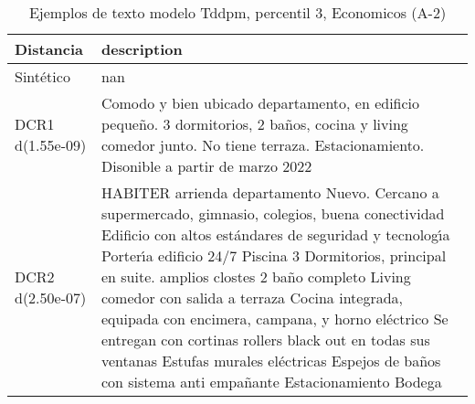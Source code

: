 \begin{table}[H]
\centering
\fontsize{10}{14}\selectfont
\caption{Ejemplos de texto modelo Tddpm, percentil 3, Economicos (A-2)}
\label{table-example-economicos-a-2-tddpm_mlp-3p-text}
\begin{tabular}{|l|m{35em}|}
\hline
\rowcolor[gray]{0.8}
Distancia & description \\
\hline Sintético & nan \\
\hline DCR1 d(1.55e-09) & Comodo y bien ubicado departamento, en edificio peque\~no. 3 dormitorios, 2 ba\~nos, cocina y living comedor junto. No tiene terraza. Estacionamiento. Disonible a partir de marzo 2022 \\
\hline DCR2 d(2.50e-07) & HABITER arrienda departamento Nuevo.  Cercano a supermercado, gimnasio, colegios, buena conectividad  Edificio con altos est\'andares de seguridad y tecnolog{\'\i}a Porter{\'\i}a edificio 24/7 Piscina  3 Dormitorios, principal en suite. amplios clostes 2 ba\~no completo Living comedor con salida a terraza Cocina integrada, equipada con encimera, campana, y horno el\'ectrico   Se entregan con cortinas rollers black out en todas sus ventanas Estufas murales el\'ectricas Espejos de ba\~nos con sistema anti empa\~nante Estacionamiento  Bodega \\
\hline
\end{tabular}
\end{table}
